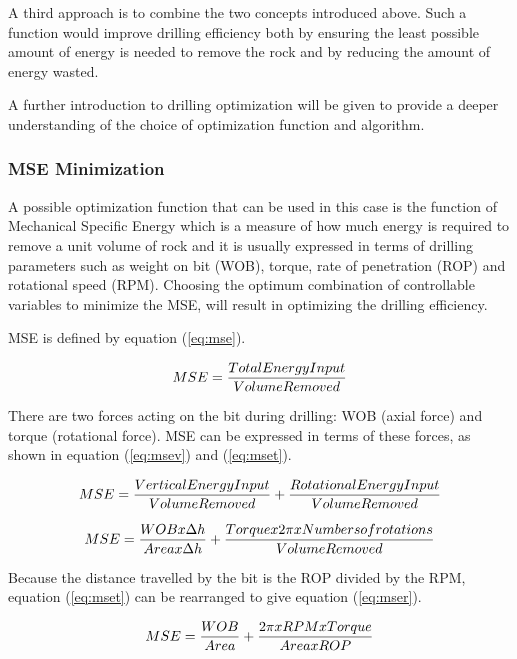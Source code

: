 A third approach is to combine the two concepts introduced above. Such a function would improve drilling efficiency both by ensuring the least possible amount of energy is needed to remove the rock and by reducing the amount of energy wasted.

A further introduction to drilling optimization will be given to provide a deeper understanding of the choice of optimization function and algorithm.

\subsubsection{MSE Minimization}

A possible optimization function that can be used in this case is the function of Mechanical Specific Energy which is a measure of how much energy is required to remove a unit volume of rock and it is usually expressed in terms of drilling parameters such as weight on bit (WOB), torque, rate of penetration (ROP) and rotational speed (RPM). Choosing the optimum combination of controllable variables to minimize the MSE, will result in optimizing the drilling efficiency. 

MSE is defined by equation (\ref{eq:mse}).

\begin{equation}
\centering
   MSE = \frac{Total Energy Input}{Volume Removed}
\label{eq:mse}
\end{equation}

There are two forces acting on the bit during drilling: WOB (axial force) and torque (rotational force). MSE can be expressed in terms of these forces, as shown in equation (\ref{eq:msev}) and (\ref{eq:mset}). 

\begin{equation}
\centering
   MSE = \frac{Vertical Energy Input}{Volume Removed} + \frac{Rotational Energy Input}{Volume Removed}
\label{eq:msev}
\end{equation}

\begin{equation}
\centering
   MSE = \frac{WOB x \Delta h}{Area x \Delta h} + \frac{Torque x 2\pi x Numbers of rotations}{Volume Removed}
\label{eq:mset}
\end{equation}

Because the distance travelled by the bit is the ROP divided by the RPM, equation (\ref{eq:mset}) can be rearranged to give equation (\ref{eq:mser}).

\begin{equation}
\centering
   MSE = \frac{WOB}{Area} + \frac{2\pi x RPM x Torque}{Area x ROP}
\label{eq:mser}
\end{equation}

